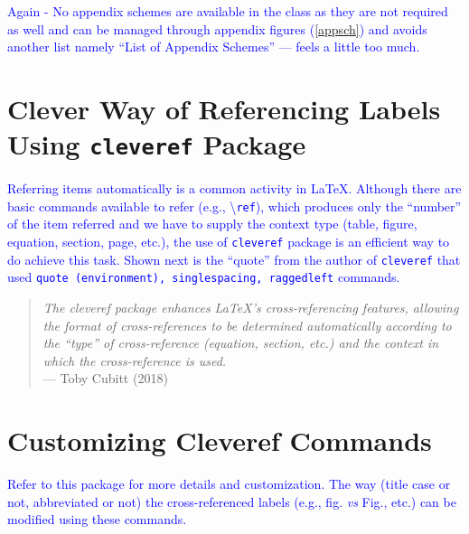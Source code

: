 \documentclass[phd,showgrids]{ndsu-thesis-2022}
\newcommand\italk[1]{\textcolor{blue}{#1}}  %
\newcommand\cmd[1]{\textbackslash\texttt{#1}}  %
\begin{document}
\kant[4]\kant[9]

\italk{Again - No appendix schemes are available in the class as they are not required as well and can be managed through appendix figures (\cref{appsch}) and avoids another list namely ``List of Appendix Schemes'' --- feels a little too much.}




\section{Clever Way of Referencing Labels Using \texttt{cleveref} Package}
\italk{Referring items automatically is a common activity in \LaTeX. Although there are basic commands available to refer (e.g., \cmd{ref}), which produces only the ``number'' of the item referred and we have to supply the context type (table, figure, equation, section, page, etc.), the use of \texttt{cleveref} package is an efficient way to do achieve this task. Shown next is the ``quote'' from the author of \texttt{cleveref} that used \texttt{quote (environment), singlespacing, raggedleft} commands.}

\vspace{-4ex}
\textcolor{magenta}{
\begin{quote}
\singlespacing
\raggedleft
\textit{The cleveref package enhances \LaTeX's cross-referencing features, allowing the format of cross-references to be determined automatically according to the ``type'' of cross-reference (equation, section, etc.) and the context in which the cross-reference is used.} 
\\\hfill --- Toby Cubitt (2018)
\end{quote}
}

\section{Customizing Cleveref Commands}
\italk{Refer to this package for more details and customization. The way (title case or not, abbreviated or not) the cross-referenced labels (e.g., fig. \emph{vs} Fig., etc.) can be modified using these commands. 
}
\end{document}
